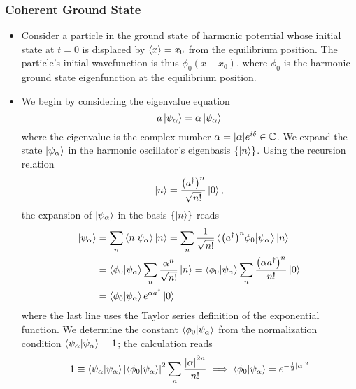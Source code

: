 \documentclass[11pt, a4paper]{article}
\newcommand{\p}{\psi}  %
\renewcommand{\k}[1]{\ket{#1}}
\begin{document}
\subsubsection{Coherent Ground State}
\begin{itemize}
	\item Consider a particle in the ground state of harmonic potential whose initial state at $ t = 0 $ is displaced by $ \ev{x} = x_{0} $ from the equilibrium position. The particle's initial wavefunction is thus $ \phi_{0}(x - x_{0}) $, where $ \phi_{0} $ is the harmonic ground state eigenfunction at the equilibrium position.
	
	\item We begin by considering the eigenvalue equation
	\begin{equation*}
		a \k{\psi_{\alpha}} = \alpha\k{\p_{\alpha}}
	\end{equation*}
	where the eigenvalue is the complex number $ \alpha = \abs{\alpha}e^{i\delta} \in \mathbb{C}$. We expand the state $ \k{\p_{\alpha}} $ in the harmonic oscillator's eigenbasis $ \{\ket{n}\} $. Using the recursion relation
	\begin{equation*}
		\ket{n} = \frac{\big(a^{\dagger}\big)^{n}}{\sqrt{n!}}\k{0},
	\end{equation*}
	the expansion of $ \k{\p_{\alpha}} $ in the basis $ \{\k{n} \} $ reads
	\begin{align*}
		\k{\p_{\alpha}} &= \sum_{n}\braket{n}{\p_{\alpha}}\ket{n} = \sum_{n} \frac{1}{\sqrt{n!}} \braket{\big(a^{\dagger}\big)^{n}\phi_{0}}{\p_{\alpha}}\ket{n} \\
		& = \braket{\phi_{0}}{\p_{\alpha}}\sum_{n}\frac{\alpha^{n}}{\sqrt{n!}}\ket{n} = \braket{\phi_{0}}{\p_{\alpha}}\sum_{n}\frac{\big(\alpha a^{\dagger}\big)^{n}}{n!}\ket{0}\\
		& = \braket{\phi_{0}}{\p_{\alpha}}e^{\alpha a^{\dagger}}\ket{0}
	\end{align*} 
	where the last line uses the Taylor series definition of the exponential function. We determine the constant $ \braket{\phi_{0}}{\p_{\alpha}} $ from the normalization condition $ \braket{\p_{\alpha}}{\p_{\alpha}} \equiv 1 $; the calculation reads
	\begin{equation*}
		1 \equiv \braket{\p_{\alpha}}{\p_{\alpha}} \abs{\braket{\phi_{0}}{\p_{\alpha}}}^{2}\sum_{n}\frac{\abs{\alpha}^{2n}}{n!} \implies \braket{\phi_{0}}{\p_{\alpha}} = e^{-\frac{1}{2}\abs{\alpha}^{2}}
	\end{equation*}
	

\end{itemize}
\end{document}
